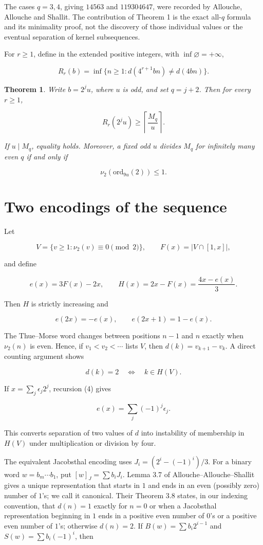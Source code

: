 \documentclass[11pt]{article}
\newtheorem{theorem}{Theorem}
\numberwithin{equation}{section}
\begin{document}
The cases $q=3,4$, giving $14563$ and $119304647$, were recorded by Allouche, Allouche and
Shallit. The contribution of Theorem 1 is the exact all-$q$ formula and its minimality proof, not
the discovery of those individual values or the eventual separation of kernel subsequences.

For $r\geq1$, define in the extended positive integers, with $\inf\varnothing=+\infty$,

\[
R_r(b)=\inf\{n\geq1:d(4^{r+1}bn)\neq d(4bn)\}.
\]

\begin{theorem}


Write $b=2^ju$, where $u$ is odd, and set $q=j+2$. Then for every $r\geq1$,

\[
R_r(2^ju)\geq\left\lceil\frac{M_q}{u}\right\rceil.
\tag{2}
\]

If $u\mid M_q$, equality holds. Moreover, a fixed odd $u$ divides $M_q$ for infinitely many
even $q$ if and only if

\[
\nu_2(\mathrm{ord}_{9u}(2))\leq1.
\tag{3}
\]

\end{theorem}

\section{Two encodings of the sequence}


Let

\[
V=\{v\geq1:\nu_2(v)\equiv0\pmod2\},\qquad F(x)=|V\cap[1,x]|,
\]

and define

\[
e(x)=3F(x)-2x,\qquad H(x)=2x-F(x)=\frac{4x-e(x)}3.
\]

Then $H$ is strictly increasing and

\[
e(2x)=-e(x),\qquad e(2x+1)=1-e(x).
\tag{4}
\]

The Thue--Morse word changes between positions $n-1$ and $n$ exactly when $\nu_2(n)$ is even.
Hence, if $v_1<v_2<\cdots$ lists $V$, then $d(k)=v_{k+1}-v_k$. A direct counting argument shows

\[
d(k)=2\quad\Longleftrightarrow\quad k\in H(V).
\tag{5}
\]

If $x=\sum_j\epsilon_j2^j$, recursion (4) gives

\[
e(x)=\sum_j(-1)^j\epsilon_j.
\tag{6}
\]

This converts separation of two values of $d$ into instability of membership in $H(V)$ under
multiplication or division by four.

The equivalent Jacobsthal encoding uses $J_i=(2^i-(-1)^i)/3$. For a binary word
$w=b_m\cdots b_1$, put $[w]_J=\sum b_iJ_i$. Lemma 3.7 of
Allouche--Allouche--Shallit gives a unique representation that starts in $1$ and ends in an even
(possibly zero) number of $1$'s; we call it canonical. Their Theorem 3.8 states, in our indexing
convention, that $d(n)=1$ exactly for $n=0$ or when a Jacobsthal representation beginning in $1$
ends in a positive even number of $0$'s or a positive even number of $1$'s; otherwise $d(n)=2$.
If $B(w)=\sum b_i2^{i-1}$ and $S(w)=\sum b_i(-1)^i$, then
\end{document}

